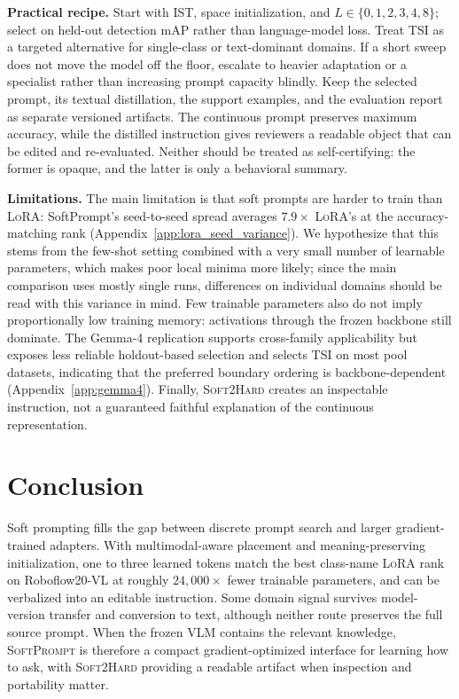 \documentclass{article}
\newcommand{\ours}{\textsc{SoftPrompt}}
\newcommand{\lora}{\textsc{LoRA}}
\newcommand{\distill}{\textsc{Soft2Hard}}
\newcommand{\rftwenty}{Roboflow20-VL}
\begin{document}
\textbf{Practical recipe.}
Start with IST, space initialization, and
$L\in\{0,1,2,3,4,8\}$; select on held-out detection mAP rather than
language-model loss.
Treat TSI as a targeted alternative for single-class or text-dominant domains.
If a short sweep does not move the model off the floor, escalate to heavier
adaptation or a specialist rather than increasing prompt capacity blindly.
Keep the selected prompt, its textual distillation, the support examples, and
the evaluation report as separate versioned artifacts. The continuous prompt
preserves maximum accuracy, while the distilled instruction gives reviewers a
readable object that can be edited and re-evaluated. Neither should be treated
as self-certifying: the former is opaque, and the latter is only a behavioral
summary.

\textbf{Limitations.}
The main limitation is that soft prompts are harder to train than \lora{}:
SoftPrompt's seed-to-seed spread averages $7.9\times$ \lora{}'s at the
accuracy-matching rank (Appendix~\ref{app:lora_seed_variance}).
We hypothesize that this stems from the few-shot setting combined with a very small number
of learnable parameters, which makes poor local minima more likely; since the
main comparison uses mostly single runs, differences on individual domains
should be read with this variance in mind.
Few trainable parameters also do not imply proportionally low training memory:
activations through the frozen backbone still dominate.
The Gemma-4 replication supports cross-family applicability but exposes less
reliable holdout-based selection and selects TSI on most pool datasets,
indicating that the preferred boundary ordering is backbone-dependent
(Appendix~\ref{app:gemma4}).
Finally, \distill{} creates an inspectable instruction, not a guaranteed
faithful explanation of the continuous representation.

\section{Conclusion}
\label{sec:conclusion}

Soft prompting fills the gap between discrete prompt search and larger
gradient-trained adapters.
With multimodal-aware placement and meaning-preserving initialization, one to
three learned tokens match the best class-name \lora{} rank on
\rftwenty{} at roughly $24{,}000\times$ fewer trainable parameters, and can be
verbalized into an editable instruction.
Some domain signal survives model-version transfer and conversion to text,
although neither route preserves the full source prompt.
When the frozen VLM contains the relevant knowledge, \ours{} is therefore a
compact gradient-optimized interface for learning how to ask, with \distill{}
providing a readable artifact when inspection and portability matter.
\end{document}
